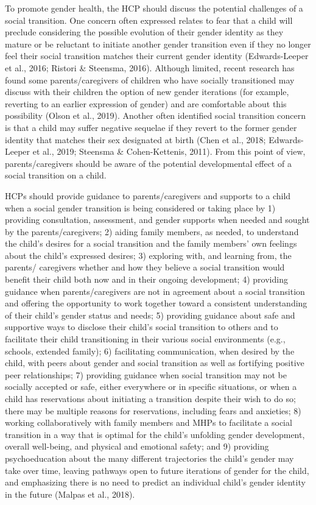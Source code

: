 \documentclass[
]{book}
\begin{document}
To promote gender health, the HCP should discuss the potential challenges of a social transition.
One concern often expressed relates to fear that a
child will preclude considering the possible evolution
of their gender identity as they mature or be reluctant to initiate another gender transition even if they
no longer feel their social transition matches their
current gender identity (Edwards-Leeper et al., 2016;
Ristori \& Steensma, 2016). Although limited, recent
research has found some parents/caregivers of children who have socially transitioned may discuss
with their children the option of new gender iterations (for example, reverting to an earlier expression of gender) and are comfortable about this
possibility (Olson et al., 2019). Another often identified social transition concern is that a child may
suffer negative sequelae if they revert to the former
gender identity that matches their sex designated at
birth (Chen et al., 2018; Edwards-Leeper et al., 2019;
Steensma \& Cohen-Kettenis, 2011). From this point
of view, parents/caregivers should be aware of the
potential developmental effect of a social transition
on a child.

HCPs should provide guidance to parents/caregivers and supports to a child when a social gender transition is being considered or taking place
by 1) providing consultation, assessment, and gender supports when needed and sought by the parents/caregivers; 2) aiding family members, as
needed, to understand the child's desires for a
social transition and the family members' own
feelings about the child's expressed desires; 3)
exploring with, and learning from, the parents/
caregivers whether and how they believe a social
transition would benefit their child both now and
in their ongoing development; 4) providing guidance when parents/caregivers are not in agreement
about a social transition and offering the opportunity to work together toward a consistent understanding of their child's gender status and needs;
5) providing guidance about safe and supportive
ways to disclose their child's social transition to
others and to facilitate their child transitioning in
their various social environments (e.g., schools,
extended family); 6) facilitating communication,
when desired by the child, with peers about gender
and social transition as well as fortifying positive
peer relationships; 7) providing guidance when
social transition may not be socially accepted or
safe, either everywhere or in specific situations, or
when a child has reservations about initiating a
transition despite their wish to do so; there may
be multiple reasons for reservations, including
fears and anxieties; 8) working collaboratively with
family members and MHPs to facilitate a social
transition in a way that is optimal for the child's
unfolding gender development, overall well-being,
and physical and emotional safety; and 9) providing psychoeducation about the many different trajectories the child's gender may take over time,
leaving pathways open to future iterations of gender for the child, and emphasizing there is no
need to predict an individual child's gender identity in the future (Malpas et al., 2018).
\end{document}
